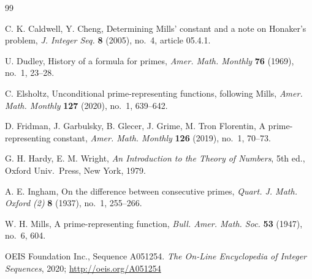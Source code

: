 \documentclass{article}
\theoremstyle{plain}
\begin{document}
\begin{thebibliography}{99}

{C. K. Caldwell, Y. Cheng}, %
Determining Mills' constant and a note on Honaker's problem, 
\textit{J. Integer Seq.} 
\textbf{8} (2005), no.~4, article 05.4.1.

{U. Dudley}, 
History of a formula for primes,
\textit{Amer. Math. Monthly} 
\textbf{76} (1969), no.~1, 23--28.

{C. Elsholtz}, 
Unconditional prime-representing functions, following Mills,
\textit{Amer. Math. Monthly} 
\textbf{127} (2020), no.~1, 639--642.

{D. Fridman, J. Garbulsky, B. Glecer, J. Grime, M. Tron Florentin},
A prime-representing constant,
\textit{Amer. Math. Monthly} 
\textbf{126} (2019), no.~1, 70--73.

{G. H. Hardy, E. M. Wright}, 
\textit{An Introduction to the Theory of Numbers}, 5th ed., 
Oxford Univ.\ Press, New York, 1979.

{A. E. Ingham},
On the difference between consecutive primes,
\textit{Quart. J. Math. Oxford (2)}
\textbf{8} (1937), no.~1, 255--266.



{W. H. Mills}, 
A prime-representing function, 
\textit{Bull. Amer. Math. Soc.} 
\textbf{53} (1947), no.~6, 604.


{OEIS Foundation Inc.},
Sequence A051254.
\textit{The On-Line Encyclopedia of Integer Sequences}, 2020;
\url{http://oeis.org/A051254}


\end{thebibliography}
\end{document}
